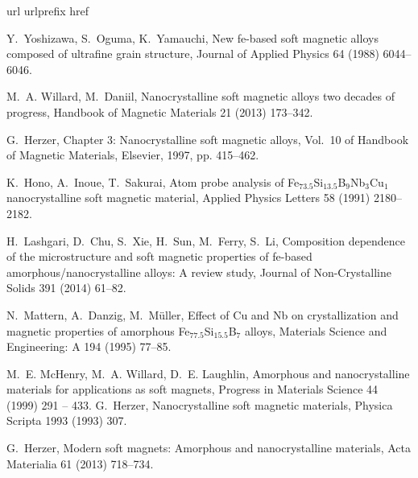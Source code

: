 \begin{thebibliography}{10}
\expandafter\ifx\csname url\endcsname\relax
  \def\url#1{\texttt{#1}}\fi
\expandafter\ifx\csname urlprefix\endcsname\relax\def\urlprefix{URL }\fi
\expandafter\ifx\csname href\endcsname\relax
  \def\href#1#2{#2} \def\path#1{#1}\fi

Y.~Yoshizawa, S.~Oguma, K.~Yamauchi, New fe-based soft magnetic alloys composed
  of ultrafine grain structure, Journal of Applied Physics 64 (1988)
  6044--6046.


M.~A. Willard, M.~Daniil, Nanocrystalline soft magnetic alloys two decades of
  progress, Handbook of Magnetic Materials 21 (2013) 173--342.

G.~Herzer, {Chapter
  3: Nanocrystalline soft magnetic alloys}, Vol.~10 of Handbook of Magnetic
  Materials, Elsevier, 1997, pp. 415--462.

K.~Hono, A.~Inoue, T.~Sakurai, Atom probe analysis of Fe$_{73.5}$Si$_{13.5}$B$_9$Nb$_3$Cu$_1$
  nanocrystalline soft magnetic material, Applied Physics Letters 58 (1991)
  2180--2182.

H.~Lashgari, D.~Chu, S.~Xie, H.~Sun, M.~Ferry, S.~Li, Composition dependence of
  the microstructure and soft magnetic properties of fe-based
  amorphous/nanocrystalline alloys: A review study, Journal of Non-Crystalline
  Solids 391 (2014) 61--82.

N.~Mattern, A.~Danzig, M.~M{\"u}ller, Effect of Cu and Nb on crystallization
  and magnetic properties of amorphous Fe$_{77.5}$Si$_{15.5}$B$_7$ alloys, Materials
  Science and Engineering: A 194 (1995) 77--85.

M.~E. McHenry, M.~A. Willard, D.~E. Laughlin,
  {Amorphous
  and nanocrystalline materials for applications as soft magnets}, Progress in
  Materials Science 44 (1999) 291 -- 433.
G.~Herzer, Nanocrystalline soft magnetic materials, Physica Scripta 1993 (1993)
  307.

G.~Herzer, Modern soft magnets: Amorphous and nanocrystalline materials, Acta
  Materialia 61 (2013) 718--734.


\end{thebibliography}
